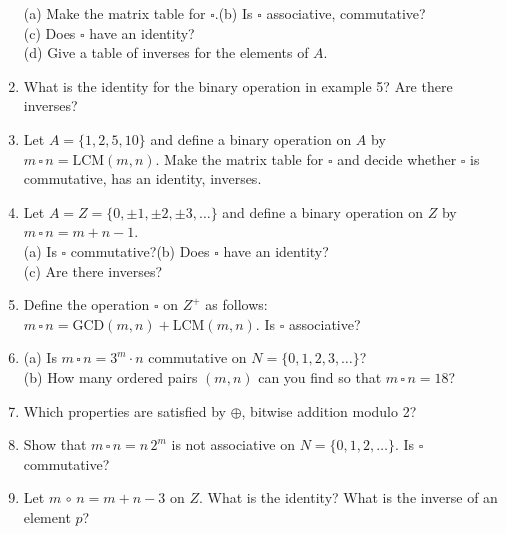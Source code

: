 \documentclass[12pt]{book}
\theoremstyle{definition}
\begin{document}
\begin{enumerate}
(a) Make the matrix table for $\square$.\qquad (b) Is $\square$ associative, commutative?\\
(c) Does $\square$ have an identity?\\
(d) Give a table of inverses for the elements of $A$.
\item What is the identity for the binary operation in example 5?  Are there inverses?
\item Let $A=\{1,2,5,10\}$ and define a binary operation on $A$ by $m\,\square\,n = \text{LCM}(m,n)$.  Make the matrix table for $\square$ and decide whether $\square$ is commutative, has an identity, inverses.
\item Let $A=Z=\{0,\pm1, \pm2,\pm3,\dots\}$ and define a binary operation on $Z$ by $m\,\square\,n=m+n-1$.\\
(a) Is $\square$ commutative?\qquad (b) Does $\square$ have an identity?\\
(c) Are there inverses?
\item Define the operation $\square$ on $Z^+$ as follows: $m\,\square\,n = \text{GCD}(m,n)+\text{LCM}(m,n)$.  Is $\square$ associative?
\item (a) Is $m\,\square\,n=3^m\cdot n$ commutative on $N=\{0,1,2,3,\dots\}$?\\
(b) How many ordered pairs $(m,n)$ can you find so that $m\,\square\,n = 18$?
\item Which properties are satisfied by $\oplus$, bitwise addition modulo 2?
\item Show that $m\,\square\,n = n\,2^m$ is not associative on $N=\{0,1,2,\dots\}$.  Is $\square$ commutative?
\item Let $m\,\circ\,n = m+n-3$ on $Z$.  What is the identity?  What is the inverse of an element $p$?
\end{enumerate}
\end{document}
